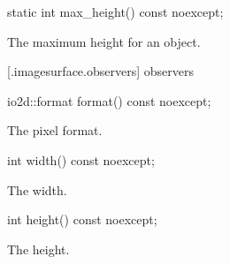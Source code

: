%
\begin{itemdecl}
static int max_height() const noexcept;
\end{itemdecl}
\begin{itemdescr}
\pnum
\returns
The maximum height for an  object.
\end{itemdescr}
    

 [\iotwod.imagesurface.observers] { observers}

%
\begin{itemdecl}
io2d::format format() const noexcept;
\end{itemdecl}
\begin{itemdescr}
\pnum
\returns
The pixel format.
\end{itemdescr}

%
\begin{itemdecl}
int width() const noexcept;
\end{itemdecl}
\begin{itemdescr}
\pnum
\returns
The width.
\end{itemdescr}

%
\begin{itemdecl}
int height() const noexcept;
\end{itemdecl}
\begin{itemdescr}
\pnum
\returns
The height.
\end{itemdescr}
